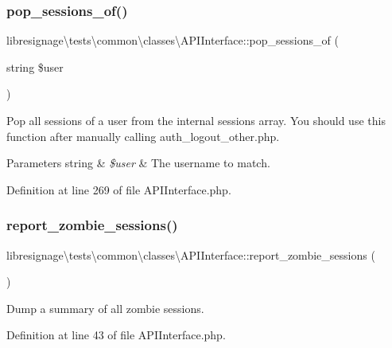 \subsubsection{\texorpdfstring{pop\+\_\+sessions\+\_\+of()}{pop\_sessions\_of()}}
{\footnotesize\ttfamily libresignage\textbackslash{}tests\textbackslash{}common\textbackslash{}classes\textbackslash{}\+A\+P\+I\+Interface\+::pop\+\_\+sessions\+\_\+of (\begin{DoxyParamCaption}\item[{string}]{\$user }\end{DoxyParamCaption})}

Pop all sessions of a user from the internal sessions array. You should use this function after manually calling auth\+\_\+logout\+\_\+other.\+php.


\begin{DoxyParams}[1]{Parameters}
string & {\em \$user} & The username to match. \\
\hline
\end{DoxyParams}


Definition at line 269 of file A\+P\+I\+Interface.\+php.

\mbox{\label{classlibresignage_1_1tests_1_1common_1_1classes_1_1APIInterface_a6b7ea59abeb97427bff353ee40845523}} 
\subsubsection{\texorpdfstring{report\+\_\+zombie\+\_\+sessions()}{report\_zombie\_sessions()}}
{\footnotesize\ttfamily libresignage\textbackslash{}tests\textbackslash{}common\textbackslash{}classes\textbackslash{}\+A\+P\+I\+Interface\+::report\+\_\+zombie\+\_\+sessions (\begin{DoxyParamCaption}{ }\end{DoxyParamCaption})}

Dump a summary of all zombie sessions. 

Definition at line 43 of file A\+P\+I\+Interface.\+php.



